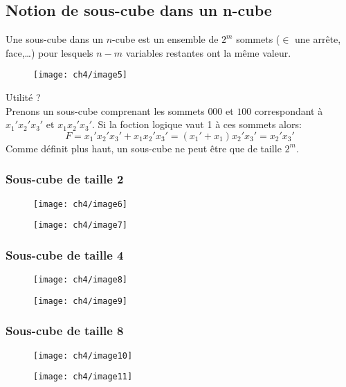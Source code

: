 \subsection{Notion de sous-cube dans un n-cube}
Une sous-cube dans un $n$-cube est un ensemble de $2^m$ sommets ($\in$ une arrête, face,\dots) pour lesquels $n-m$ variables restantes ont la même valeur.
\begin{figure}[H]
	\centering
	\texttt{[image: ch4/image5]}
\end{figure}
Utilité ?\\
Prenons un sous-cube comprenant les sommets $000$ et $100$ correspondant à $x_1'x_2'x_3'$ et $x_1x_2'x_3'$. Si la foction logique vaut 1 à ces sommets alors:
\begin{equation}
	F=x_1'x_2'x_3'+x_1x_2'x_3' = (x_1'+x_1)x_2'x_3'=x_2'x_3'
\end{equation}
Comme définit plus haut, un sous-cube ne peut être que de taille $2^m$.
\subsubsection{Sous-cube de taille 2}
	\begin{figure}[H]
		\begin{minipage}{.5\textwidth}
			\centering
			\texttt{[image: ch4/image6]}
		\end{minipage}
		\begin{minipage}{.5\textwidth}
			\centering
			\texttt{[image: ch4/image7]}
		\end{minipage}
	\end{figure}
\subsubsection{Sous-cube de taille 4}
	\begin{figure}[H]
		\begin{minipage}{.5\textwidth}
			\centering
			\texttt{[image: ch4/image8]}
		\end{minipage}
		\begin{minipage}{.5\textwidth}
			\centering
			\texttt{[image: ch4/image9]}
		\end{minipage}
	\end{figure}
\subsubsection{Sous-cube de taille 8}
	\begin{figure}[H]
		\begin{minipage}{.5\textwidth}
			\centering
			\texttt{[image: ch4/image10]}
		\end{minipage}
		\begin{minipage}{.5\textwidth}
			\centering
			\texttt{[image: ch4/image11]}
		\end{minipage}
	\end{figure}
